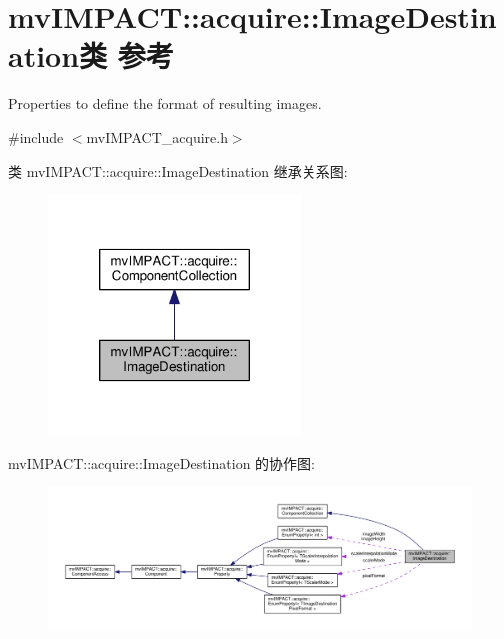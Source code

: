 \hypertarget{classmv_i_m_p_a_c_t_1_1acquire_1_1_image_destination}{\section{mv\+I\+M\+P\+A\+C\+T\+:\+:acquire\+:\+:Image\+Destination类 参考}
\label{classmv_i_m_p_a_c_t_1_1acquire_1_1_image_destination}
}


Properties to define the format of resulting images.  




{\ttfamily \#include $<$mv\+I\+M\+P\+A\+C\+T\+\_\+acquire.\+h$>$}



类 mv\+I\+M\+P\+A\+C\+T\+:\+:acquire\+:\+:Image\+Destination 继承关系图\+:
\nopagebreak
\begin{figure}[H]
\begin{center}
\leavevmode
\includegraphics[width=190pt]{classmv_i_m_p_a_c_t_1_1acquire_1_1_image_destination__inherit__graph}
\end{center}
\end{figure}


mv\+I\+M\+P\+A\+C\+T\+:\+:acquire\+:\+:Image\+Destination 的协作图\+:
\nopagebreak
\begin{figure}[H]
\begin{center}
\leavevmode
\includegraphics[width=350pt]{classmv_i_m_p_a_c_t_1_1acquire_1_1_image_destination__coll__graph}
\end{center}
\end{figure}
